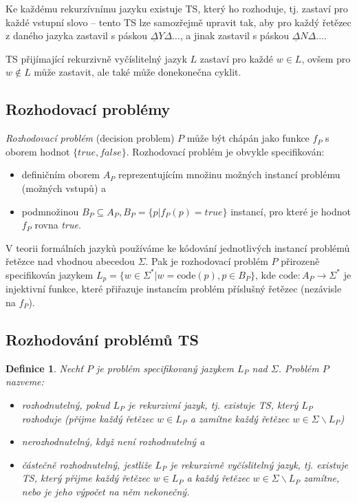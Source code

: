 \documentclass[a4paper, 11pt]{report}
\newtheorem{mydef}{Definice}[chapter]
\begin{document}
Ke každému rekurzívnímu jazyku existuje TS, který ho rozhoduje, tj. zastaví pro každé vstupní slovo -- tento TS lze samozřejmě upravit tak, aby pro každý řetězec z daného jazyka zastavil s páskou $\underline{\Delta} Y \Delta \dots$, a jinak zastavil s páskou $\underline{\Delta} N \Delta \dots$.

TS přijímající rekurzivně vyčíslitelný jazyk $L$ zastaví pro každé $w \in L$, ovšem pro $w \not\in L$ může zastavit, ale také může donekonečna cyklit.

\subsection{Rozhodovací problémy}

\emph{Rozhodovací problém} (decision problem) $P$ může být chápán jako funkce $f_P$ s oborem hodnot $\{true, false\}$. Rozhodovací problém je obvykle specifikován:
\begin{itemize}
	\item definičním oborem $A_P$ reprezentujícím množinu možných instancí problému (možných vstupů) a
	\item podmnožinou $B_P \subseteq A_P, B_P = \{p | f_P(p) = true\}$ instancí, pro které je hodnot $f_P$ rovna \emph{true}.
\end{itemize}
V teorii formálních jazyků používáme ke kódování jednotlivých instancí problémů řetězce nad vhodnou abecedou $\Sigma$. Pak je rozhodovací problém $P$ přirozeně specifikován jazykem $L_p = \{ w \in \Sigma^* | w = \text{code}(p), p \in B_P\}$, kde $\text{code}:  A_P \to \Sigma^*$ je injektivní funkce, které přiřazuje instancím problém příslušný řetězec (nezávisle na $f_P$).

\subsection{Rozhodování problémů TS}
\begin{mydef}
Nechť $P$ je problém specifikovaný jazykem $L_P$ nad $\Sigma$. Problém $P$ nazveme:
\begin{itemize}
	\item rozhodnutelný, pokud $L_P$ je rekurzivní jazyk, tj. existuje TS, který $L_P$ rozhoduje (přijme každý řetězec $w \in L_P$ a zamítne každý řetězec $w \in \Sigma \backslash L_P$)
	\item nerozhodnutelný, když není rozhodnutelný a 
	\item částečně rozhodnutelný, jestliže $L_P$ je rekurzivně vyčíslitelný jazyk, tj. existuje TS, který přijme každý řetězec $w \in L_P$ a každý řetězec $w \in \Sigma \backslash L_P$ zamítne, nebo je jeho výpočet na něm nekonečný.
\end{itemize}
\end{mydef}
\end{document}
